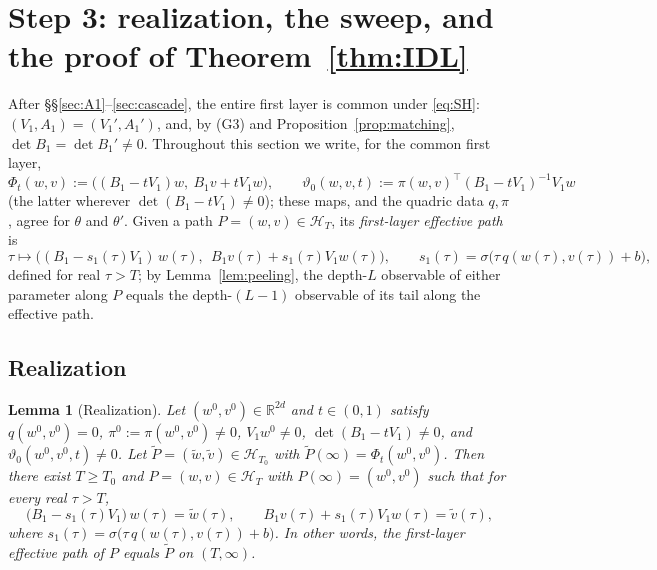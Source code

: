 \documentclass[11pt]{article}
\newtheorem{lemma}[theorem]{Lemma}
\theoremstyle{definition}
\theoremstyle{remark}
\theoremstyle{plain}
\newcommand{\R}{\mathbb{R}}
\newcommand{\cH}{\mathcal{H}}
\newcommand{\sig}{\sigma}
\begin{document}
\section{Step 3: realization, the sweep, and the proof of Theorem~\ref{thm:IDL}}
\label{sec:descent}

After \S\S\ref{sec:A1}--\ref{sec:cascade}, the entire first layer is common under
\eqref{eq:SH}: $(V_1,A_1)=(V_1',A_1')$, and, by (G3) and
Proposition~\ref{prop:matching}, $\det B_1=\det B_1'\neq0$.  Throughout this section we
write, for the common first layer,
\[
\Phi_t(w,v):=\big((B_1-tV_1)w,\ B_1v+tV_1w\big),
\qquad
\vartheta_0(w,v,t):=\pi(w,v)^\top(B_1-tV_1)^{-1}V_1w
\]
(the latter wherever $\det(B_1-tV_1)\neq0$); these maps, and the quadric data $q,\pi$,
agree for $\theta$ and $\theta'$.  Given a path $P=(w,v)\in\cH_T$, its
\emph{first-layer effective path} is
\[
\tau\longmapsto\Big((B_1-s_1(\tau)V_1)\,w(\tau),\ \ B_1v(\tau)+s_1(\tau)V_1w(\tau)\Big),
\qquad
s_1(\tau)=\sig\big(\tau\,q(w(\tau),v(\tau))+b\big),
\]
defined for real $\tau>T$; by Lemma~\ref{lem:peeling}, the depth-$L$ observable of
either parameter along $P$ equals the depth-$(L-1)$ observable of its tail along the
effective path.

\subsection{Realization}

\begin{lemma}[Realization]\label{lem:realization}
Let $(w^0,v^0)\in\R^{2d}$ and $t\in(0,1)$ satisfy $q(w^0,v^0)=0$,
$\pi^0:=\pi(w^0,v^0)\neq0$, $V_1w^0\neq0$, $\det(B_1-tV_1)\neq0$, and
$\vartheta_0(w^0,v^0,t)\neq0$.  Let $\widetilde P=(\widetilde w,\widetilde v)\in
\cH_{T_0}$ with $\widetilde P(\infty)=\Phi_t(w^0,v^0)$.  Then there exist $T\ge T_0$
and $P=(w,v)\in\cH_T$ with $P(\infty)=(w^0,v^0)$ such that for every real $\tau>T$,
\[
\big(B_1-s_1(\tau)V_1\big)\,w(\tau)=\widetilde w(\tau),
\qquad
B_1v(\tau)+s_1(\tau)V_1w(\tau)=\widetilde v(\tau),
\]
where $s_1(\tau)=\sig\big(\tau\,q(w(\tau),v(\tau))+b\big)$.  In other words, the
first-layer effective path of $P$ equals $\widetilde P$ on $(T,\infty)$.
\end{lemma}
\end{document}
